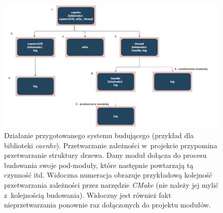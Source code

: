 \begin{figure}
\centering
\includegraphics[width=\textwidth]{res/CMakeOrder.pdf}
\caption{Działanie przygotowanego systemu budującego (przykład dla biblioteki \textit{caenhv}). Przetwarzanie zależności w~projekcie przypomina przetwarzanie struktury drzewa. Dany moduł dołącza do procesu budowania swoje pod-moduły, które następnie powtarzają tą czynność itd. Widoczna numeracja obrazuje przykładową kolejność przetwarzania zależności przez narzędzie \textit{CMake} (nie należy jej mylić z~kolejnością budowania). Widoczny jest również fakt nieprzetwarzania ponownie raz dołączonych do projektu modułów.}
\label{fig:cmakeorder}
\end{figure}


